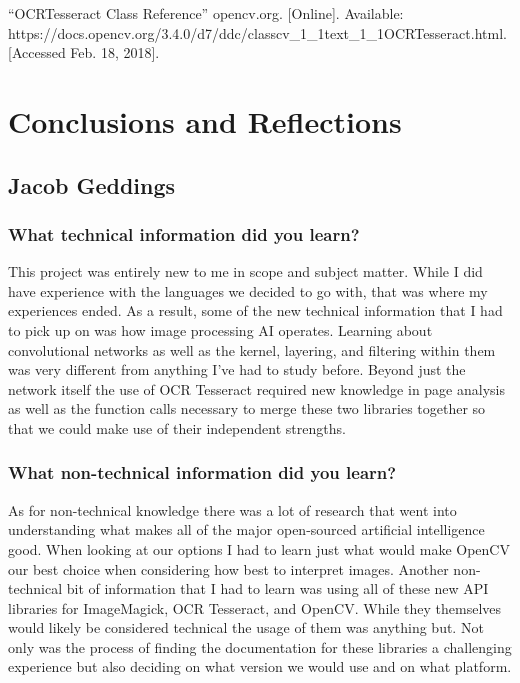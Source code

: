 \documentclass[article, onecolumn, draftclsnofoot,10pt, compsoc]{IEEEtran}
\begin{document}
“OCRTesseract Class Reference” opencv.org. [Online]. Available: https://docs.opencv.org/3.4.0/d7/ddc/classcv\_1\_1text\_1\_1OCRTesseract.html. [Accessed Feb. 18, 2018].

\section{Conclusions and Reflections}
\subsection{Jacob Geddings}
\subsubsection{What technical information did you learn?}
This project was entirely new to me in scope and subject matter. While I did have experience with the languages we decided to go with, that was where my experiences ended. As a result, some of the new technical information that I had to pick up on was how image processing AI operates. Learning about convolutional networks as well as the kernel, layering, and filtering within them was very different from anything I’ve had to study before. Beyond just the network itself the use of OCR Tesseract required new knowledge in page analysis as well as the function calls necessary to merge these two libraries together so that we could make use of their independent strengths.

\subsubsection{What non-technical information did you learn?}
As for non-technical knowledge there was a lot of research that went into understanding what makes all of the major open-sourced artificial intelligence good. When looking at our options I had to learn just what would make OpenCV our best choice when considering how best to interpret images. Another non-technical bit of information that I had to learn was using all of these new API libraries for ImageMagick, OCR Tesseract, and OpenCV. While they themselves would likely be considered technical the usage of them was anything but. Not only was the process of finding the documentation for these libraries a challenging experience but also deciding on what version we would use and on what platform.
\end{document}
